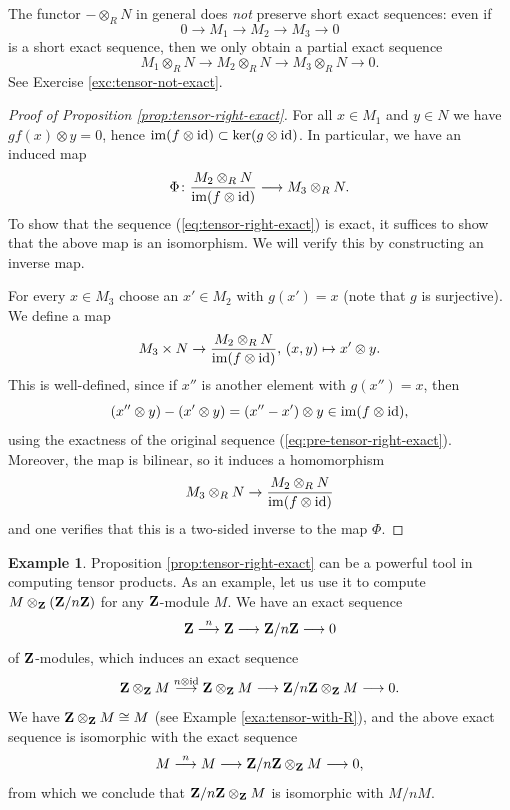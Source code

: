 \documentclass[11pt]{amsbook}
\newcommand{\longto}{\longrightarrow}
\DeclareMathOperator\im{im}
\def\id{{\rm id}}
\theoremstyle{plain}
\theoremstyle{definition}
\newtheorem{example}[theorem]{Example}
\begin{document}
The functor $-\otimes_R N$ in general does \emph{not} preserve short exact sequences: even if
\[
	0\to M_1 \to M_2 \to M_3 \to 0
\]
is a short exact sequence, then we only obtain a partial exact sequence
\[
	 M_1\otimes_R N \to M_2\otimes_R N \to M_3\otimes_R N \to 0.
\]
See Exercise \ref{exc:tensor-not-exact}.

\begin{proof}[Proof of Proposition \ref{prop:tensor-right-exact}]
For all $x\in M_1$ and $y\in N$ we have $gf(x)\otimes y=0$, hence $\im (f\otimes \id) \subset \ker (g\otimes \id)$. In particular, we have an induced map
\begin{equation}\label{eq:tensor-exact-induced}
	\Phi\colon \frac{M_2\otimes_R N}{\im (f\otimes \id)} \longto M_3 \otimes_R N.
\end{equation}
To show that the sequence (\ref{eq:tensor-right-exact}) is exact, it suffices to show that the above map is an isomorphism.  We will verify this by constructing an inverse map.

For every $x\in M_3$ choose an $x'\in M_2$ with $g(x')=x$ (note that $g$ is surjective). We define a map
\[
	  M_3 \times N \to \frac{M_2\otimes_R N}{\im (f\otimes \id)},\,  (x,y) \mapsto x'\otimes y.
\]
This is well-defined, since if $x''$ is another element with $g(x'')=x$, then
\[
	(x''\otimes y) - (x'\otimes y) = (x''-x') \otimes y \in \im (f\otimes \id),
\]
using the exactness of the original sequence (\ref{eq:pre-tensor-right-exact}).
Moreover, the map is bilinear, so it induces a homomorphism 
\[
	M_3\otimes_R N \to \frac{M_2\otimes_R N}{\im (f\otimes \id)}
\]
and one verifies that this is a two-sided inverse to the map $\Phi$.
\end{proof}

\begin{example}
Proposition \ref{prop:tensor-right-exact} can be a powerful tool in computing tensor products. As an example, let us use it to compute $M\otimes_{\mathbf{Z}} ({\mathbf{Z}}/n{\mathbf{Z}})$ for any ${\mathbf{Z}}$-module $M$. We have an exact sequence
\[
	\bZ \overset{n}{\longto} \bZ \longto \bZ/n\bZ \longto 0
\]
of ${\mathbf{Z}}$-modules, which induces an exact sequence
\[
	\bZ\otimes_\bZ M \overset{n\otimes \id}{\longto} \bZ \otimes_\bZ M
	 \longto \bZ/n\bZ \otimes_\bZ M \longto 0.
\]
We have ${\mathbf{Z}}\otimes_{\mathbf{Z}} M \cong M$ (see Example \ref{exa:tensor-with-R}), and the above exact sequence is isomorphic with the exact sequence
\[
	M \overset{n}{\longto} M \longto \bZ/n\bZ \otimes_\bZ M \longto 0,
\]
from which we conclude that ${\mathbf{Z}}/n{\mathbf{Z}} \otimes_{\mathbf{Z}} M$ is isomorphic with $M/nM$.
\end{example}
\end{document}
